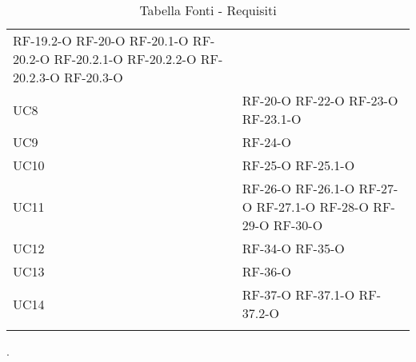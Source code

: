 \begin{longtable}{ 
		>{}p{} 
		>{}p{} }
	RF-19.2-O	\newline
	RF-20-O	\newline
	RF-20.1-O	\newline
	RF-20.2-O	\newline
	RF-20.2.1-O	\newline
	RF-20.2.2-O	\newline
	RF-20.2.3-O	\newline
	RF-20.3-O	\tabularnewline
UC8 &	RF-20-O	\newline
	RF-22-O	\newline
	RF-23-O	\newline
	RF-23.1-O	\tabularnewline
UC9 &	RF-24-O	\tabularnewline
UC10 &	RF-25-O	\newline
	RF-25.1-O	\tabularnewline
UC11 &	RF-26-O	\newline
	RF-26.1-O	\newline
	RF-27-O	\newline
	RF-27.1-O	\newline
	RF-28-O	\newline
	RF-29-O	\newline
	RF-30-O	\tabularnewline
UC12 &	RF-34-O	\newline
	RF-35-O	\tabularnewline
UC13 &	RF-36-O	\tabularnewline
UC14 &	RF-37-O	\newline
	RF-37.1-O	\newline
	RF-37.2-O	\tabularnewline
\caption{Tabella Fonti - Requisiti\label{ Tabella Fonti - Requisiti}}
\end{longtable}.
\pagebreak
